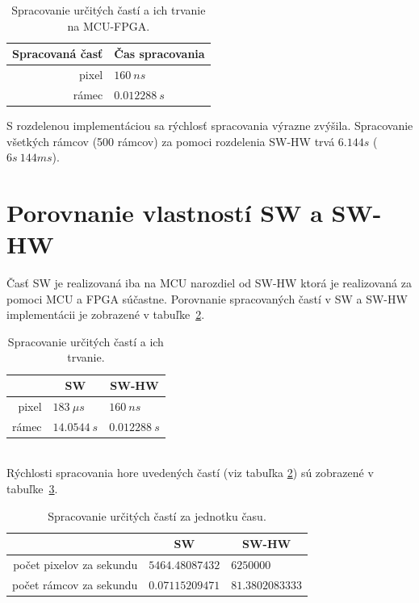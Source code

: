 \documentclass[11pt,a4paper]{article}
\begin{document}
\begin{table}[H]
  \begin{center}
    \begin{tabular}{r|l}
        \multicolumn{1}{c|}{\textbf{Spracovaná časť}} & \multicolumn{1}{c}{\textbf{Čas spracovania}}\\
        \hline
        pixel & $160 \ ns$\\
        rámec & $0.012288 \ s$\\
    \end{tabular}
    \caption{Spracovanie určitých častí a ich trvanie na MCU-FPGA.}
    \label{tab:FPGA_processing}
  \end{center}
\end{table}

S rozdelenou implementáciou sa rýchlosť spracovania výrazne zvýšila. Spracovanie všetkých rámcov (500 rámcov) za pomoci rozdelenia SW-HW trvá $6.144s$ ($6s \ 144 ms$).

\section{Porovnanie vlastností SW a SW-HW}

Časť SW je realizovaná iba na MCU narozdiel od SW-HW ktorá je realizovaná za pomoci MCU a FPGA súčastne. Porovnanie spracovaných častí v SW a SW-HW implementácii je zobrazené v tabuľke~\ref{tab:compare1}.

\begin{table}[H]
  \begin{center}
    \begin{tabular}{r|l|l}
        & \multicolumn{1}{c|}{\textbf{SW}} & \multicolumn{1}{c}{\textbf{SW-HW}}\\
        \hline
        pixel      & $183 \ \mu s$   & $160 \ ns$      \\
        rámec      & $14.0544 \ s$   & $0.012288 \ s$  \\
    \end{tabular}
    \caption{Spracovanie určitých častí a ich trvanie.}
    \label{tab:compare1}
  \end{center}
\end{table}

\hfill\\[-3em]

Rýchlosti spracovania hore uvedených častí (viz tabuľka \ref{tab:compare1}) sú zobrazené v tabuľke~\ref{tab:compare2}.

\begin{table}[H]
  \begin{center}
    \begin{tabular}{r|l|l}
        & \multicolumn{1}{c|}{\textbf{SW}} & \multicolumn{1}{c}{\textbf{SW-HW}}\\
        \hline
        počet pixelov za sekundu & $5464.48087432$ & $6250000$ \\
        počet rámcov za sekundu & $0.07115209471$ & $81.3802083333$ \\
    \end{tabular}
    \caption{Spracovanie určitých častí za jednotku času.}
    \label{tab:compare2}
  \end{center}
\end{table}
\end{document}

